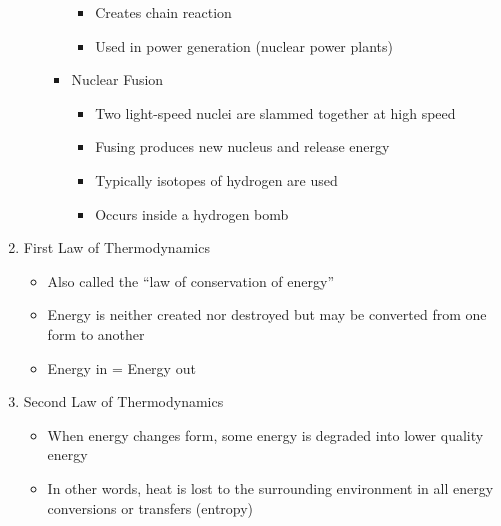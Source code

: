 \documentclass[12pt]{article}
\begin{document}
\begin{enumerate}
\begin{itemize}
\begin{itemize}
\begin{itemize}
              \item Creates chain reaction

              \item Used in power generation (nuclear power plants)

            \end{itemize}

          \item Nuclear Fusion

            \begin{itemize}

              \item Two light-speed nuclei are slammed together at high speed

              \item Fusing produces new nucleus and release energy

              \item Typically isotopes of hydrogen are used

              \item Occurs inside a hydrogen bomb

            \end{itemize}

        \end{itemize}
        
    \end{itemize}

  \item First Law of Thermodynamics

    \begin{itemize}

      \item Also called the “law of conservation of energy”

      \item Energy is neither created nor destroyed but may be converted from one form to another

      \item Energy in = Energy out

    \end{itemize}

  \item Second Law of Thermodynamics

    \begin{itemize}

      \item When energy changes form, some energy is degraded into lower quality energy


      \item In other words, heat is lost to the surrounding environment in all energy conversions or transfers (entropy)

    \end{itemize}

\end{enumerate}
\end{document}
